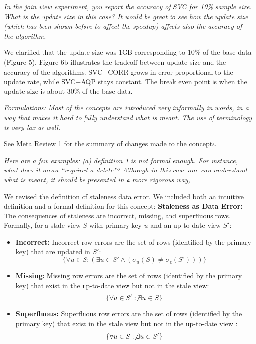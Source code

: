 \vspace{1em}
\emph{In the join view experiment, you report the accuracy of SVC for 10\% sample size. What is the update size in this case? It would be great to see how the update size (which has been shown before to affect the speedup) affects also the accuracy of the algorithm.}

We clarified that the update size was 1GB corresponding to 10\% of the base data (Figure 5). Figure 6b illustrates the tradeoff between update size and the accuracy of the algorithms. SVC+CORR grows in error proportional to the update rate, while SVC+AQP stays constant. The break even point is when the update size is about 30\% of the base data. 

\vspace{1em}
\emph{Formulations: Most of the concepts are introduced very informally in words, in a way that makes it hard to fully understand what is meant. The use of terminology is very lax as well. }

See Meta Review 1 for the summary of changes made to the concepts.

\vspace{1em}
\emph{Here are a few examples: (a) definition 1 is not formal enough. For instance, what does it mean ``required a delete"? Although in this case one can understand what is meant, it should be presented in a more rigorous way,} 

We revised the definition of staleness data error. We included both an intuitive definition and a formal definition for this concept:
\noindent \textbf{Staleness as Data Error: } The consequences of staleness are incorrect, missing, and superfluous rows. 
Formally, for a stale view $S$ with primary key $u$ and an up-to-date view $S'$:
\begin{itemize}[noitemsep] \sloppy
	\item \textbf{Incorrect: } Incorrect row errors are the set of rows (identified by the primary key) that are updated in $S'$: \[\{\forall u \in S : (\exists u \in S' \wedge (\sigma_u(S) \ne \sigma_u(S')))\}\]
	\item \textbf{Missing: } Missing row errors are the set of rows (identified by the primary key) that exist in the up-to-date view but not in the stale view: \[\{\forall u \in S' : \not \exists u \in S\}\]
	\item \textbf{Superfluous: } Superfluous row errors are the set of rows (identified by the primary key) that exist in the stale view but not in the up-to-date view : \[\{ \forall u \in S : \not\exists u \in S' \}\]
\end{itemize}

